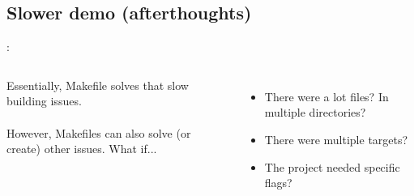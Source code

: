 \subsection{Slower demo (afterthoughts)}
\begin{frame}{\secname: \small\subsecname\normalsize}
    \begin{columns}

        Essentially, Makefile solves that slow building issues. \\~\\

        However, Makefiles can also solve (or create) other issues.
        What if... \\~\\ \pause

        \begin{itemize}
            \item There were a lot files? In multiple directories?
            \item There were multiple targets?
            \item The project needed specific flags?
        \end{itemize}

    \end{columns}
\end{frame}
